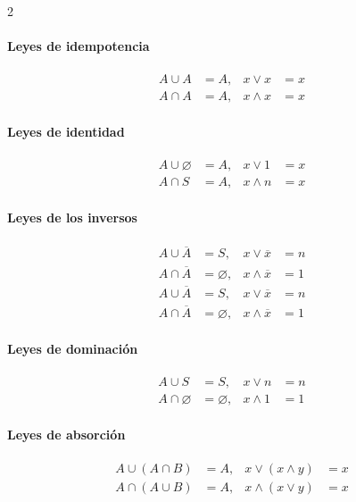 \documentclass[11pt,a4paper]{article}   %
\newcommand{\compl}[1]{\overline{#1}}    %
\begin{document}
\begin{paracol}{2}
\paragraph{Leyes de idempotencia}
\begin{align*}
A \cup A &= A, & x \lor x &= x \\
A \cap A &= A, & x \land x &= x
\end{align*}

\switchcolumn %

\paragraph{Leyes de identidad}
\begin{align*}
A \cup \varnothing &= A, & x \lor 1 &= x \\
A \cap S &= A, & x \land n &= x
\end{align*}

\switchcolumn %

\paragraph{Leyes de los inversos}
\begin{align*}
A \cup \compl{A} &= S, & x \lor \overline{x} &= n \\
A \cap \compl{A} &= \varnothing, & x \land \overline{x} &= 1 \\
A \cup \compl{A} &= S, & x \lor \overline{x} &= n \\
A \cap \compl{A} &= \varnothing, & x \land \overline{x} &= 1
\end{align*}

\switchcolumn %

\paragraph{Leyes de dominación}
\begin{align*}
A \cup S &= S, & x \lor n &= n \\
A \cap \varnothing &= \varnothing, & x \land 1 &= 1
\end{align*}

\switchcolumn %

\paragraph{Leyes de absorción}
\begin{align*}
A \cup (A \cap B) &= A, & x \lor (x \land y) &= x \\
A \cap (A \cup B) &= A, & x \land (x \lor y) &= x
\end{align*}


\end{paracol}
\end{document}
